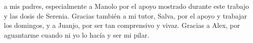 
 a mis padres, especialmente a Manolo por el apoyo mostrado durante este trabajo y las dosis de Serenia. Gracias también a mi tutor, Salva, por el apoyo y trabajar los domingos, y a Juanjo, por ser tan comprensivo y vivaz. Gracias a Alex, por aguantarme cuando ni yo lo hacía y ser mi pilar.   
